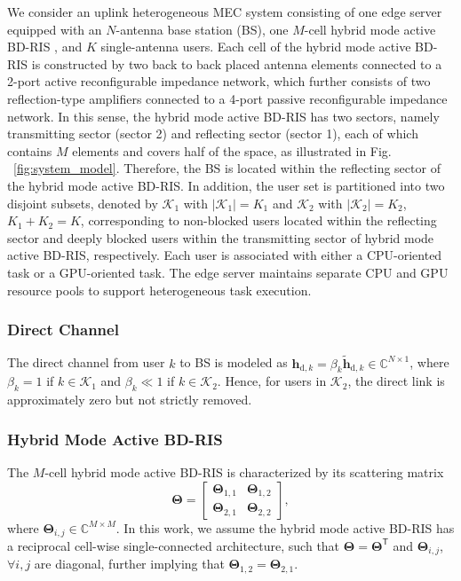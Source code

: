 \documentclass[conference]{IEEEtran}
\begin{document}
We consider an uplink heterogeneous MEC system consisting of one edge server equipped with an $N$-antenna base station (BS), one $M$-cell hybrid mode active BD-RIS \cite{liu2026active}, and $K$ single-antenna users. Each cell of the hybrid mode active BD-RIS is constructed by two back to back placed antenna elements connected to a 2-port active reconfigurable impedance network, which further consists of two reflection-type amplifiers connected to a 4-port passive reconfigurable impedance network. In this sense, the hybrid mode active BD-RIS has two sectors, namely transmitting sector (sector 2) and reflecting sector (sector 1), each of which contains $M$ elements and covers half of the space, as illustrated in Fig. ~\ref{fig:system_model}.  Therefore, the BS is located within the reflecting sector of the hybrid mode active BD-RIS. In addition, the user set is partitioned into two disjoint subsets, denoted by $\mathcal{K}_1$ with $|\mathcal{K}_1|=K_1$ and $\mathcal{K}_2$ with $|\mathcal{K}_2|=K_2$, $K_1 + K_2 = K$, corresponding to non-blocked users located within the reflecting sector and deeply blocked users within the transmitting sector of hybrid mode active BD-RIS, respectively. Each user is associated with either a CPU-oriented task or a GPU-oriented task. The edge server maintains separate CPU and GPU resource pools to support heterogeneous task execution.

\subsubsection{Direct Channel} The direct channel from user $k$ to BS is modeled as $\mathbf{h}_{\mathrm{d},k} = \beta_k\tilde{\mathbf{h}}_{\mathrm{d},k}\in\mathbb{C}^{N\times 1}$, where $\beta_k = 1$ if $k\in\mathcal{K}_1$ and $\beta_k \ll 1$ if $k\in\mathcal{K}_2$. 
Hence, for users in $\mathcal{K}_2$, the direct link is approximately zero but not strictly removed.


\subsubsection{Hybrid Mode Active BD-RIS} The $M$-cell hybrid mode active BD-RIS is characterized by its scattering matrix \cite{liu2026active}
\begin{equation}
    \mathbf{\Theta} =\left[ \begin{matrix}\mathbf{\Theta}_{1,1} &\mathbf{\Theta}_{1,2}\\
    \mathbf{\Theta}_{2,1} &\mathbf{\Theta}_{2,2}\end{matrix}\right],
\end{equation}
where $\mathbf{\Theta}_{i,j} \in\mathbb{C}^{M\times M}$. In this work, we assume the hybrid mode active BD-RIS has a reciprocal cell-wise single-connected architecture, such that $\mathbf{\Theta} = \mathbf{\Theta}^\mathsf{T}$ and $\mathbf{\Theta}_{i,j}$, $\forall i,j$ are diagonal, further implying that $\mathbf{\Theta}_{1,2} = \mathbf{\Theta}_{2,1}$.  
\end{document}
